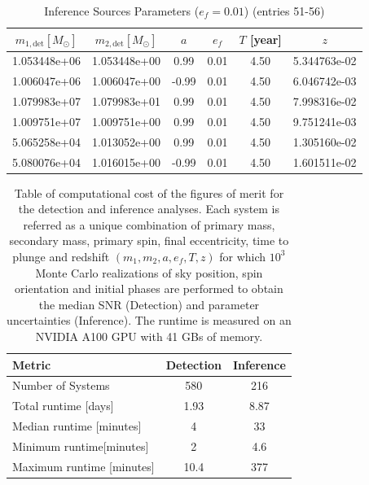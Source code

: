 \documentclass{article}
\begin{document}
\clearpage

\begin{table}[htbp]
\centering
\caption{Inference Sources Parameters ($e_f=0.01$) (entries 51-56)}
\label{tab:inference_sources_ef01_2}
\begin{tabular}{cccccc}
\hline
$m_{1,\mathrm{det}} [M_\odot]$ & $m_{2,\mathrm{det}} [M_\odot]$ & $a$ & $e_f$ & $T$ [year] & $z$ \\
\hline
1.053448e+06 & 1.053448e+00 & 0.99 & 0.01 & 4.50 & 5.344763e-02 \\
1.006047e+06 & 1.006047e+00 & -0.99 & 0.01 & 4.50 & 6.046742e-03 \\
1.079983e+07 & 1.079983e+01 & 0.99 & 0.01 & 4.50 & 7.998316e-02 \\
1.009751e+07 & 1.009751e+00 & 0.99 & 0.01 & 4.50 & 9.751241e-03 \\
5.065258e+04 & 1.013052e+00 & 0.99 & 0.01 & 4.50 & 1.305160e-02 \\
5.080076e+04 & 1.016015e+00 & -0.99 & 0.01 & 4.50 & 1.601511e-02 \\
\hline
\end{tabular}
\end{table}

\clearpage


    \begin{table}
    \centering
    \begin{tabular}{lcc}
    \hline
    Metric & Detection & Inference \\
    \hline
    Number of Systems & 580 & 216 \\
    Total runtime [days] & 1.93 & 8.87 \\
    Median runtime [minutes] & 4 & 33 \\
    Minimum runtime[minutes] & 2 & 4.6 \\
    Maximum runtime [minutes] & 10.4 & 377 \\
    \hline
    \end{tabular}
    \caption{Table of computational cost of the figures of merit for the detection and inference analyses. 
    Each system is referred as a unique combination of primary mass, secondary mass, primary spin, final eccentricity, time to plunge and redshift $(m_1, m_2, a, e_f, T, z)$ for which $10^3$ Monte Carlo realizations of sky position, spin orientation and initial phases are performed to obtain the median SNR (Detection) and parameter uncertainties (Inference).
    The runtime is measured on an NVIDIA A100 GPU with 41 GBs of memory.}
    \label{tab:timings}
    \end{table}
    
\end{document}
